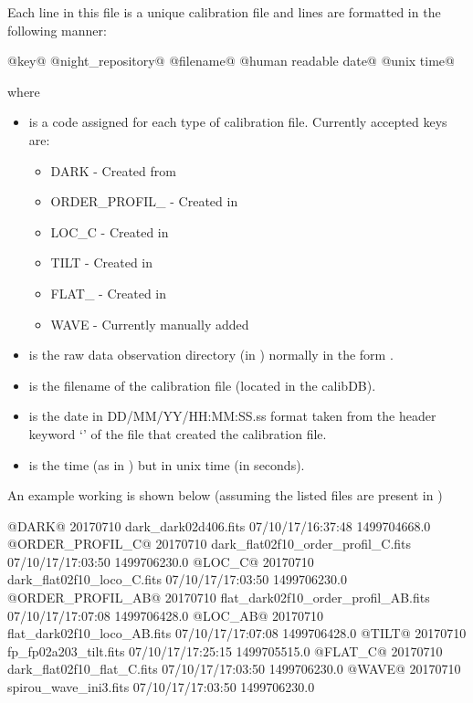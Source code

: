 \noindent Each line in this file is a unique calibration file and lines are formatted in the following manner:

\begin{textbox}[title={In calibration database file}]
@{key}@ @{night_repository}@ @{filename}@ @{human readable date}@ @{unix time}@ 
\end{textbox}
\begin{thighlight}
\noindent where
\begin{itemize}
\item {} is a code assigned for each type of calibration file. Currently accepted keys are:
\begin{itemize}
\item DARK - Created from \calDARK
\item ORDER\_PROFIL\_ - Created in \callocRAW
\item LOC\_C - Created in \callocRAW
\item TILT - Created in \calSLIT
\item FLAT\_ - Created in \calFFraw
\item WAVE - Currently manually added
\end{itemize}

\item {} is the raw data observation directory (in ) normally in the form \constantFolderDateFormat.

\item {} is the filename of the calibration file (located in the calibDB).

\item {} is the date in DD/MM/YY/HH:MM:SS.ss format taken from the header keyword `\constantAcqtimeKey' of the file that created the calibration file.

\item {} is the time (as in ) but in unix time (in seconds).

\end{itemize}
\end{thighlight}

\noindent An example working \masterCALIBDBfile is shown below (assuming the listed files are present in )
\begin{textbox}[title={In calibration database file}]
@DARK@ 20170710 dark_dark02d406.fits 07/10/17/16:37:48 1499704668.0
@ORDER_PROFIL_C@ 20170710 dark_flat02f10_order_profil_C.fits 07/10/17/17:03:50 1499706230.0
@LOC_C@ 20170710 dark_flat02f10_loco_C.fits 07/10/17/17:03:50 1499706230.0
@ORDER_PROFIL_AB@ 20170710 flat_dark02f10_order_profil_AB.fits 07/10/17/17:07:08 1499706428.0
@LOC_AB@ 20170710 flat_dark02f10_loco_AB.fits 07/10/17/17:07:08 1499706428.0
@TILT@ 20170710 fp_fp02a203_tilt.fits 07/10/17/17:25:15 1499705515.0
@FLAT_C@ 20170710 dark_flat02f10_flat_C.fits 07/10/17/17:03:50 1499706230.0
@WAVE@ 20170710 spirou_wave_ini3.fits 07/10/17/17:03:50 1499706230.0
\end{textbox}
